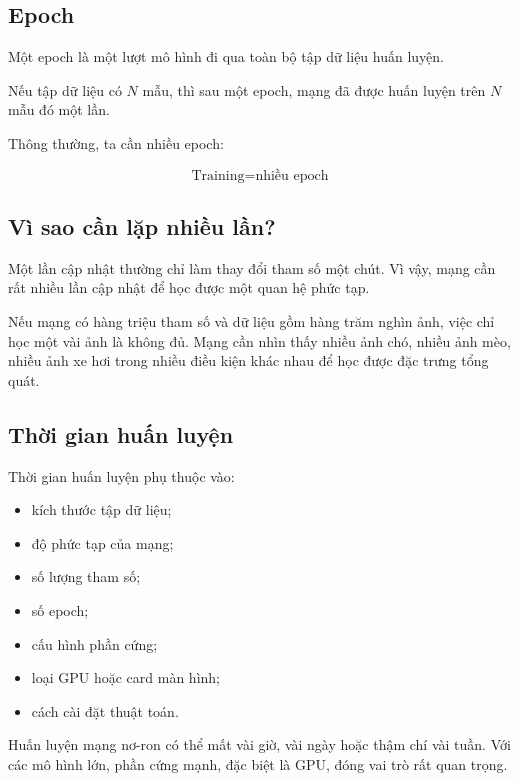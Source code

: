\subsection{Epoch}

Một epoch là một lượt mô hình đi qua toàn bộ tập dữ liệu huấn luyện.

Nếu tập dữ liệu có $N$ mẫu, thì sau một epoch, mạng đã được huấn luyện trên $N$ mẫu đó một lần.

Thông thường, ta cần nhiều epoch:

\[
    \text{Training} = \text{nhiều epoch}
\]

\subsection{Vì sao cần lặp nhiều lần?}

Một lần cập nhật thường chỉ làm thay đổi tham số một chút. Vì vậy, mạng cần rất nhiều lần cập nhật để học được một quan hệ phức tạp.

\begin{vidu}
Nếu mạng có hàng triệu tham số và dữ liệu gồm hàng trăm nghìn ảnh, việc chỉ học một vài ảnh là không đủ. Mạng cần nhìn thấy nhiều ảnh chó, nhiều ảnh mèo, nhiều ảnh xe hơi trong nhiều điều kiện khác nhau để học được đặc trưng tổng quát.
\end{vidu}

\subsection{Thời gian huấn luyện}

Thời gian huấn luyện phụ thuộc vào:

\begin{itemize}
    \item kích thước tập dữ liệu;
    \item độ phức tạp của mạng;
    \item số lượng tham số;
    \item số epoch;
    \item cấu hình phần cứng;
    \item loại GPU hoặc card màn hình;
    \item cách cài đặt thuật toán.
\end{itemize}

\begin{luuy}
Huấn luyện mạng nơ-ron có thể mất vài giờ, vài ngày hoặc thậm chí vài tuần. Với các mô hình lớn, phần cứng mạnh, đặc biệt là GPU, đóng vai trò rất quan trọng.
\end{luuy}

